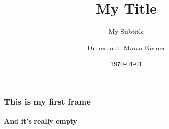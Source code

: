 \documentclass[%
  aspectratio=169,
  9pt,
  USenglish,
]{beamer}
\title{My Title}
\subtitle{My Subtitle}
\author{Dr{.}\,rer{.}\,nat{.} Marco Körner}
\institute[TUM]{Technical University of Munich, Germany\\
                Remote Sensing Technology}
\date{\today}
\begin{document}
\begin{frame}[t]
  \titlepage
\end{frame}

\begin{frame}
  \frametitle{This is my first frame}
  \framesubtitle{And it's really empty}
\end{frame}
\end{document}
